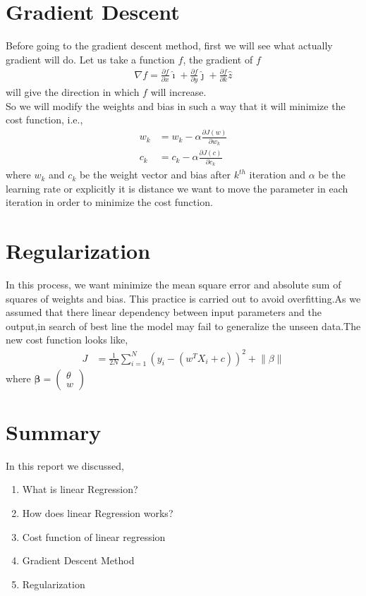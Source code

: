 \documentclass[journal,12pt,onecolumn]{IEEEtran}
\providecommand{\brak}[1]{\ensuremath{\left(#1\right)}}
\theoremstyle{remark}
\providecommand{\norm}[1]{\left\lVert#1\right\rVert}
\newcommand{\myvec}[1]{\ensuremath{\begin{pmatrix}#1\end{pmatrix}}}
\numberwithin{equation}{section}
\let\vec\mathbf
\begin{document}
  \section{Gradient Descent}
   Before going to the gradient descent method, first we will see what actually gradient will do. Let us take a function $f$, the gradient of $f$
                 \begin{align}
			 \nabla f =\frac{\partial f}{\partial x}\hat{\imath} + \frac{\partial f}{\partial y}\hat{\jmath} +\frac{\partial f}{\partial k}\hat{z}
	         \end{align}
		 will give the direction in which $f$ will increase.\\
      So we will modify the weights and bias in such a way that it will minimize the cost function, i.e.,
       \begin{align}
	       w_{k} &= w_{k} -\alpha \frac{\partial J\brak{w}}{\partial w_{k}} \\
	       c_{k} &= c_{k} -\alpha \frac{\partial J\brak{c}}{\partial c_{k}}
       \end{align}
        where $w_{k}$ and $c_{k}$ be the weight vector and bias after $k^{th}$ iteration and $\alpha$ be the learning rate or explicitly it is distance we want to move the parameter in each iteration in order to minimize the cost function. 
  \section{Regularization}
    In this process, we want minimize the mean square error and absolute sum of squares of weights and bias. This practice is carried out to avoid overfitting.As we assumed that there linear dependency between input parameters and the output,in search of best line the model may fail to generalize the unseen data.The new cost function looks like,
           \begin{align}
		   J&= \frac{1}{2N}\sum_{i=1}^{N}\brak{y_{i}-\brak{w^TX_{i}+c}}^{2} + \norm{\beta}
           \end{align}
	   where $\vec{\beta} = \myvec{\theta \\ w}$
  \section{Summary}
  In this report we discussed,
    \begin{enumerate}
     \item What is linear Regression?
     \item How does linear Regression works? 
     \item Cost function of linear regression	     
     \item Gradient Descent Method
     \item Regularization
     \end{enumerate}
\end{document}
